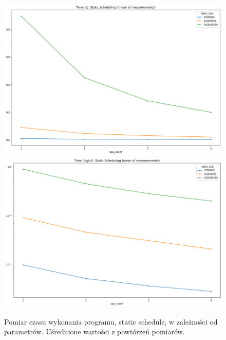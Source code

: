 \documentclass{article}
\begin{document}
        \begin{figure}[h!]
            \centering
            \includegraphics[width=17cm]{report2/images/Type/ex3_static_mean.png}
            \includegraphics[width=17cm]{report2/images/Type/ex3_static_mean_log.png}
            \caption{Pomiar czasu wykonania programu, static schedule, w zależności od parametrów. Uśrednione wartości z powtórzeń pomiarów. }
        \end{figure}
        \newpage
\end{document}
